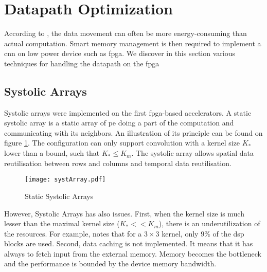 \section{Datapath Optimization} \label{sec:dtptopti}
According to \cite{chen_eyeriss_2017}, the data movement can often be more energy-consuming than actual computation. Smart memory management is then required to implement a \acrshort{cnn} on low power device such as \acrshort{fpga}. We discover in this section various techniques for handling the datapath on the \acrshort{fpga}
%
%
\subsection{Systolic Arrays}
%
%
Systolic arrays were implemented on the first \acrshort{fpga}-based accelerators. A static systolic array is a static array of \acrshort{pe} doing a part of the computation and communicating with its neighbors. An illustration of its principle can be found on figure \ref{fig:sytar}. The configuration can only support convolution with a kernel size $K_*$ lower than a bound, such that $K_* \leq K_m$. The systolic array allows spatial data reutilisation between rows and columns and temporal data reutilisation.\newline \newline
\begin{figure}
    \centering
    \texttt{[image: systArray.pdf]}
    \caption{Static Systolic Arrays}
    \label{fig:sytar}
\end{figure}
However, Systolic Arrays has also issues. First, when the kernel size is much lesser than the maximal kernel size ($K_* << K_m$), there is an underutilization of the resources. For example, \cite{gokhale_240_2014} notes that for a $3 \times 3$ kernel, only $9\%$ of the \acrfull{dsp} blocks are used. Second,  data caching is not implemented. It means that it has always to fetch input from the external memory. Memory becomes the bottleneck and the performance is bounded by the device memory bandwidth.
%
%
